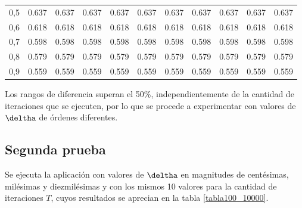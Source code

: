 \begin{table}[H]
\begin{tabular}{crrrrrrrrrr}
0,5                          & 0.637                    & 0.637                    & 0.637                    & 0.637                    & 0.637                    & 0.637                    & 0.637                    & 0.637                    & 0.637                    & 0.637                     \\ 
0,6                          & 0.618                    & 0.618                    & 0.618                    & 0.618                    & 0.618                    & 0.618                    & 0.618                    & 0.618                    & 0.618                    & 0.618                     \\ 
0,7                          & 0.598                    & 0.598                    & 0.598                    & 0.598                    & 0.598                    & 0.598                    & 0.598                    & 0.598                    & 0.598                    & 0.598                     \\ 
0,8                          & 0.579                    & 0.579                    & 0.579                    & 0.579                    & 0.579                    & 0.579                    & 0.579                    & 0.579                    & 0.579                    & 0.579                     \\ 
0,9                          & 0.559                    & 0.559                    & 0.559                    & 0.559                    & 0.559                    & 0.559                    & 0.559                    & 0.559                    & 0.559                    & 0.559                     \\ \hline
\end{tabular}
\label{tabla10}
\end{table}
Los rangos de diferencia superan el 50\%, independientemente de la cantidad de iteraciones que se ejecuten, por lo que se procede a experimentar con valores de $\deltha$ de órdenes diferentes. 

\subsection{Segunda prueba}

Se ejecuta la aplicación con valores de $\deltha$ en magnitudes de centésimas, milésimas y diezmilésimas y con los mismos 10 valores para la cantidad de iteraciones $T$, cuyos resultados se aprecian en la tabla \ref{tabla100_10000}.

